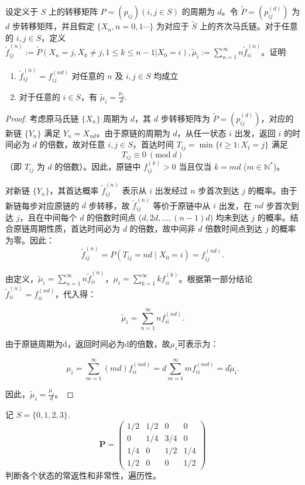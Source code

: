 \documentclass[lang=cn,10pt,thmcnt=section]{elegantbook}
\begin{document}
\begin{example}
	设定义于 $S$ 上的转移矩阵 $P = (p_{ij}) (i, j \in S)$ 的周期为 $d$。令 $\tilde{P} = (p_{ij}^{(d)})$ 为 $d$ 步转移矩阵，并且假定 $\{X_n, n = 0, 1 \cdots\}$ 为对应于 $\tilde{S}$ 上的齐次马氏链。对于任意的 $i, j \in S$，定义 $\tilde{f}_{ij}^{(n)} := \tilde{P}(X_n = j, X_k \neq j, 1 \leq k \leq n - 1 | X_0 = i), \tilde{\mu}_i := \sum_{n=1}^{\infty} n \tilde{f}_{ii}^{(n)}$。证明
    \begin{enumerate}
        \item $\tilde{f}_{ij}^{(n)} = f_{ij}^{(nd)}$ 对任意的 $n$ 及 $i, j \in S$ 均成立
        \item 对于任意的 $i \in S$，有 $\tilde{\mu}_i = \frac{\mu_i}{d}$.
    \end{enumerate}
\end{example}
\begin{proof}
	考虑原马氏链 $\{X_n\}$ 周期为 $d$，其 $d$ 步转移矩阵为 $\tilde{P} = (p_{ij}^{(d)})$，对应的新链 $\{Y_n\}$ 满足 $Y_n = X_{nd}$。由于原链的周期为 $d$，从任一状态 $i$ 出发，返回 $i$ 的时间必为 $d$ 的倍数，故对任意 $i, j \in S$，首达时间 $T_{ij} = \min\{t \geq 1: X_t = j\}$ 满足
	\[
	T_{ij} \equiv 0 \ (\text{mod} \ d)
	\]
	（即 $T_{ij}$ 为 $d$ 的倍数）。因此，原链中 $f_{ij}^{(k)} > 0$ 当且仅当 $k = md$ ($m \in \mathbb{N}^*$)。
	
	对新链 $\{Y_n\}$，其首达概率 $\tilde{f}_{ij}^{(n)}$ 表示从 $i$ 出发经过 $n$ 步首次到达 $j$ 的概率。由于新链每步对应原链的 $d$ 步转移，故 $\tilde{f}_{ij}^{(n)}$ 等价于原链中从 $i$ 出发，在 $nd$ 步首次到达 $j$，且在中间每个 $d$ 的倍数时间点 ($d, 2d, \ldots, (n-1)d$) 均未到达 $j$ 的概率。结合原链周期性质，首达时间必为 $d$ 的倍数，故中间非 $d$ 倍数时间点到达 $j$ 的概率为零。因此：
\[
\tilde{f}_{ij}^{(n)} = P(T_{ij} = nd \mid X_0 = i) = f_{ij}^{(nd)}.
\]


由定义，$\tilde{\mu}_i = \sum_{n=1}^{\infty} n \tilde{f}_{ii}^{(n)}$，$\mu_i = \sum_{k=1}^{\infty} k f_{ii}^{(k)}$。根据第一部分结论$\tilde{f}_{ii}^{(n)} = f_{ii}^{(nd)}$，代入得：

\[
\tilde{\mu}_i = \sum_{n=1}^{\infty} n f_{ii}^{(nd)}.
\]

由于原链周期为d，返回时间必为d的倍数，故$\mu_i$可表示为：

\[
\mu_i = \sum_{m=1}^{\infty} (md) f_{ii}^{(md)} = d \sum_{m=1}^{\infty} m f_{ii}^{(md)} = d \tilde{\mu}_i.
\]

因此，$\tilde{\mu}_i = \frac{\mu_i}{d}$。
\end{proof}
\begin{example}
	记 $S = \{0, 1, 2, 3\}$.
    \[
    \mathbf{P} = \begin{pmatrix}
    1/2 & 1/2 & 0 & 0 \\
    0 & 1/4 & 3/4 & 0 \\
    1/4 & 0 & 1/2 & 1/4 \\
    1/2 & 0 & 0 & 1/2
    \end{pmatrix}
    \]
    判断各个状态的常返性和非常性，遍历性。
\end{example}
\end{document}
